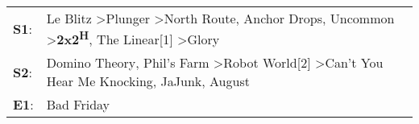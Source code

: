 \begin{supertabular}{p{0.03\textwidth}p{0.92\textwidth}}
 \textbf{S1}:  &  Le Blitz\textsuperscript{} \textgreater \enspace Plunger\textsuperscript{} \textgreater \enspace North Route\textsuperscript{}, \enspace Anchor Drops\textsuperscript{}, \enspace Uncommon\textsuperscript{} \textgreater \enspace \textbf{2x2\textsuperscript{H}}, \enspace The Linear[1]\textsuperscript{} \textgreater \enspace Glory\textsuperscript{}  \enspace  \\
 \textbf{S2}:  &                                                                                     Domino Theory\textsuperscript{}, \enspace Phil's Farm\textsuperscript{} \textgreater \enspace Robot World[2]\textsuperscript{} \textgreater \enspace Can't You Hear Me Knocking\textsuperscript{}, \enspace JaJunk\textsuperscript{}, \enspace August\textsuperscript{}  \enspace  \\
 \textbf{E1}:  &                                                                                                                                                                                                                                                                                                                                Bad Friday\textsuperscript{}  \enspace  \\
\end{supertabular}
